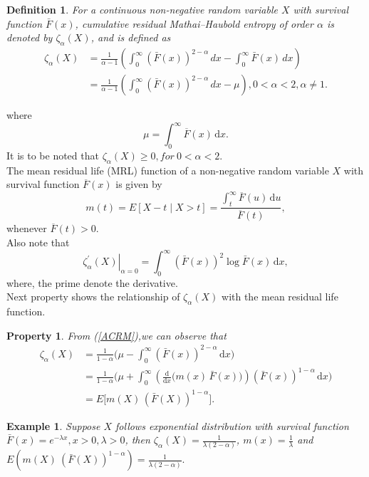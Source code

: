 \documentclass[11pt,reqno]{amsart}
\theoremstyle{tight}
\newtheorem{example}{Example}[section]
\newtheorem{definition}{Definition}[section]
\newtheorem{property}{Property}[section]
\begin{document}
 \begin{definition}
 For a continuous non-negative random variable $X$ with survival function $\bar{F}(x)$, cumulative residual Mathai--Haubold entropy of order $\alpha$ is denoted by $\zeta_{\alpha}(X)$, and is defined as
\begin{equation}\label{ACRM}
\begin{split}
\zeta_{\alpha}(X)
&= \frac{1}{\alpha-1}\left(
    \int_0^\infty (\bar{F}(x))^{2-\alpha}\,dx
    - \int_0^\infty \bar{F}(x)\,dx
\right) \\
&= \frac{1}{\alpha-1}\left(
    \int_0^\infty (\bar{F}(x))^{2-\alpha}\,dx
    - \mu
\right), 0<\alpha<2, \alpha\neq 1.
\end{split}
\end{equation}

\end{definition}
where
\[
\mu=\int_0^\infty \overline F(x)\,\mathrm{d}x.
\]
It is to be noted that $\zeta_{\alpha}(X)\geq0,for ~ 0<\alpha<2.$\\
 The mean residual life (MRL) function of a non-negative random variable  $X$ with survival function $\overline F(x)$ is given by
\[
m(t)= {E}[X-t\mid X>t]
=\frac{\int_t^\infty \overline F(u)\,\mathrm{d}u}{\overline F(t)},
\]
whenever $\overline F(t)>0$.\\
Also note that
 \[
\left. \zeta^{'}_{\alpha}(X)\right|_{\alpha=0}=\int_0^\infty (\bar F(x))^2 \log \bar F(x) \,\mathrm{d}x,
\]
where, the prime denote the derivative.\\
 Next property shows the relationship of $\zeta_{\alpha}(X)$ with the mean residual life function.
\begin{property}
From (\ref{ACRM}),we can observe that
\[
\begin{split}
\zeta_{\alpha}(X)
&=\frac{1}{1-\alpha}\Biggl(\mu
-\int_{0}^{\infty}(\bar{F}(x))^{2-\alpha}\,\mathrm{d}x\Biggr)\\
&=\frac{1}{1-\alpha}\Biggl(\mu
+\int_{0}^{\infty}
\left(\frac{\mathrm{d}}{\mathrm{d}x}\big(m(x)\,\bar{F}(x)\big)\right)
(\bar{F}(x))^{1-\alpha}\,\mathrm{d}x\Biggr)\\
&= {E} \!\big[m(X)\,(\bar{F}(X))^{1-\alpha}\big].
\end{split}
\]





\end{property}
\begin{example}
Suppose $X$ follows exponential distribution with survival function $\bar{F}(x)=e^{-\lambda x},x>0,\lambda>0$, then $\zeta_{\alpha}(X)=\frac{1}{\lambda(2-\alpha)}$, $m(x)=\frac{1}{\lambda}$ and $E(m(X)~(\bar{F}(X))^{1-\alpha})=\frac{1}{\lambda(2-\alpha)}.$
\end{example}
\end{document}

